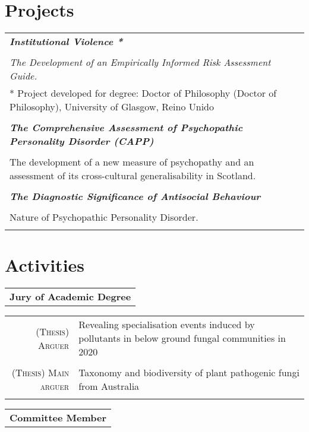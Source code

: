 \documentclass [a4paper,10pt]{article}
\begin{document}
\section{Projects}
\begin{tabular}{p{11cm}}
\\
\large \textbf{\emph{Institutional Violence *}}\normalsize\\\\
\emph{The Development of an Empirically Informed Risk Assessment Guide.}\\
\footnotesize{* Project developed for degree: Doctor of Philosophy (Doctor of Philosophy), University of Glasgow, Reino Unido}\\\\

\large \textbf{\emph{The Comprehensive Assessment of Psychopathic Personality Disorder (CAPP)}}\normalsize\\\\
The development of a new measure of psychopathy and an assessment of its cross-cultural generalisability in Scotland.\\\\
\large \textbf{\emph{The Diagnostic Significance of Antisocial Behaviour}}\normalsize\\\\
Nature of Psychopathic Personality Disorder.\\\\
\end{tabular}
\section{Activities}
\begin{tabular}{r}
\\\large
\textbf{Jury of Academic Degree}
\normalsize
\end{tabular}

\begin{tabular}{r p{11cm}}	
\textsc{(Thesis) Arguer} & Revealing specialisation events induced by pollutants in below ground fungal communities in 2020\\ \\
\textsc{(Thesis) Main arguer} & Taxonomy and biodiversity of plant pathogenic fungi from Australia\\ \\
\end{tabular}
\begin{tabular}{r}
\large
\textbf{Committee Member}
\normalsize
\end{tabular}
\end{document}
